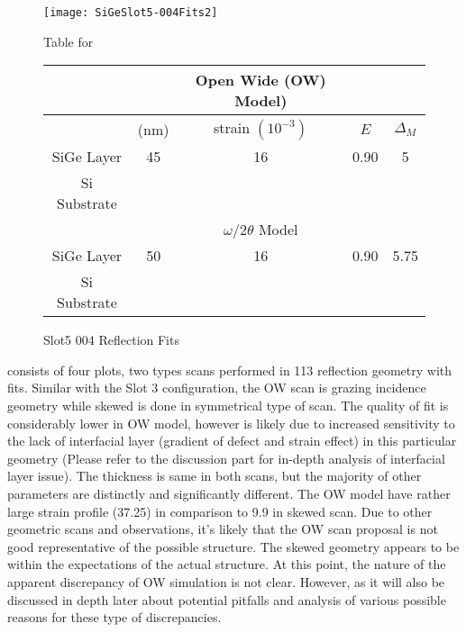 \begin{figure}[hc]%
\caption{Slot5 004 Reflection Fits}
\label{Slot5-004}
\begin{minipage}{0.85\linewidth}
\texttt{[image: SiGeSlot5-004Fits2]}
\end{minipage}
\begin{minipage}{\linewidth}
\centering
\vspace{10pt}
Table for \\
\vspace{5pt}
\begin{tabular}{c|cccc}
			& 	&Open Wide (OW) Model)	 \\
\hline
			&	(nm)	&	strain	 $(10^{-3})$&	$E$ &  $\Delta_M$\\
\hline
SiGe Layer		&  	45	&      16	 & 0.90 & 5	\\
Si Substrate		&	\textemdash & \textemdash&\textemdash\ &\textemdash	\\
\hline
			& &$\omega/2\theta$ Model \\
\hline
SiGe Layer		&	50	& 16	& 0.90	& 5.75	\\
Si Substrate		&	\textemdash & \textemdash&\textemdash\ &\textemdash
\end{tabular}
\end{minipage}
\end{figure}

 consists of four plots, two types scans performed in 113 reflection geometry with fits.  Similar with the Slot 3 configuration, the OW scan is grazing incidence geometry while skewed is done in symmetrical type of scan.  The quality of fit is considerably lower in OW model, however is likely due to increased sensitivity to the lack of interfacial layer (gradient of defect and strain effect) in this particular geometry (Please refer to the discussion part for in-depth analysis of interfacial layer issue).  The thickness is same in both scans, but the majority of other parameters are distinctly and significantly different.  The OW model have rather large strain profile (37.25) in comparison to 9.9 in skewed scan.  Due to other geometric scans and observations, it's likely that the OW scan proposal is not good representative of the possible structure.  The skewed geometry appears to be within the expectations of the actual structure.  At this point, the nature of the apparent discrepancy of OW simulation is not clear.  However, as it will also be discussed in depth later about potential pitfalls and analysis of various possible reasons for these type of discrepancies.

